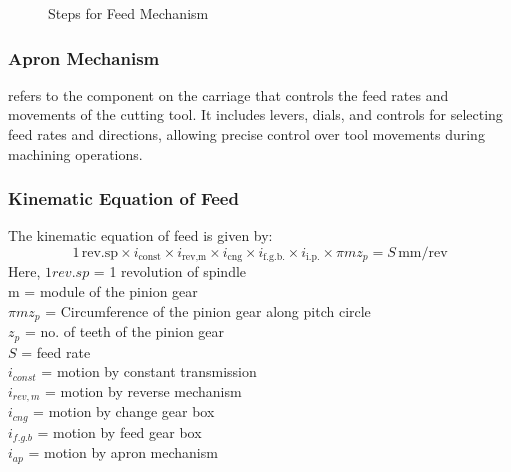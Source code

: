\documentclass{article}
\begin{document}
\begin{figure}[h]
 
  \caption{Steps for Feed Mechanism} 
\end{figure}

\subsubsection*{Apron Mechanism}
refers to the component on the carriage that controls the feed rates and movements of the cutting tool. It includes levers, dials, and controls for selecting feed rates and directions, allowing precise control over tool movements during machining operations.


\subsubsection*{Kinematic Equation of Feed}
The kinematic equation of feed is given by:
\[1 \, \text{rev.sp} \times i_{\text{const}} \times i_{\text{rev,m}} \times i_{\text{cng}} \times i_{\text{f.g.b.}} \times i_{\text{i.p.}} \times \pi m z_p = S \, \text{mm/rev}\]
Here, $1 rev.sp$ = 1 revolution of spindle \\
m = module of the pinion gear \\
$\pi m z_p$ = Circumference of the pinion gear along pitch circle \\
$z_p$ = no. of teeth of the pinion gear \\
$S$ = feed rate \\ 
$i_{const}$ = motion by constant transmission \\
$i_{rev,m}$ = motion by reverse mechanism \\
$i_{cng}$ = motion by change gear box \\
$i_{f.g.b}$ = motion by feed gear box \\
$i_{ap}$ = motion by apron mechanism \\
\end{document}
